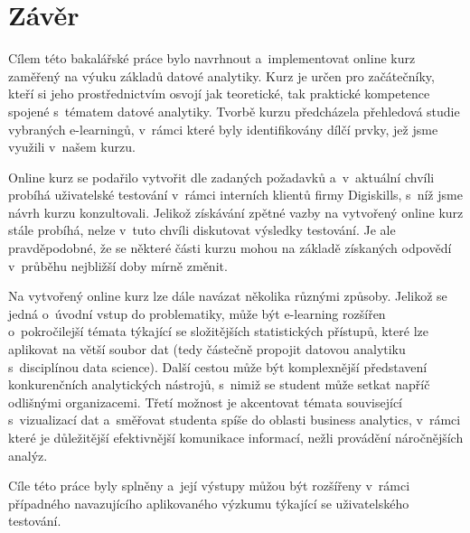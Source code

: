 \hypertarget{zuxe1vux11br}{%
\chapter*{Závěr}\label{zaver}}

Cílem této bakalářské práce bylo navrhnout a~implementovat online kurz zaměřený na výuku základů datové analytiky. Kurz je určen pro začátečníky, kteří si jeho prostřednictvím osvojí jak teoretické, tak praktické kompetence spojené s~tématem datové analytiky. Tvorbě kurzu předcházela přehledová studie vybraných e-learningů, v~rámci které byly identifikovány dílčí prvky, jež jsme využili v~našem kurzu.

Online kurz se podařilo vytvořit dle zadaných požadavků a~v~aktuální chvíli probíhá uživatelské testování v~rámci interních klientů firmy Digiskills, s~níž jsme návrh kurzu konzultovali. Jelikož získávání zpětné vazby na vytvořený online kurz stále probíhá, nelze v~tuto chvíli diskutovat výsledky testování. Je ale pravděpodobné, že se některé části kurzu mohou na základě získaných odpovědí v~průběhu nejbližší doby mírně změnit.

Na vytvořený online kurz lze dále navázat několika různými způsoby. Jelikož se jedná o~úvodní vstup do problematiky, může být e-learning rozšířen o~pokročilejší témata týkající se složitějších statistických přístupů, které lze aplikovat na větší soubor dat (tedy částečně propojit datovou analytiku s~disciplínou data science). Další cestou může být komplexnější představení konkurenčních analytických nástrojů, s~nimiž se student může setkat napříč odlišnými organizacemi. Třetí možnost je akcentovat témata související s~vizualizací dat a~směřovat studenta spíše do oblasti business analytics, v~rámci které je důležitější efektivnější komunikace informací, nežli provádění náročnějších analýz.

Cíle této práce byly splněny a~její výstupy můžou být rozšířeny v~rámci případného navazujícího aplikovaného výzkumu týkající se uživatelského testování.
